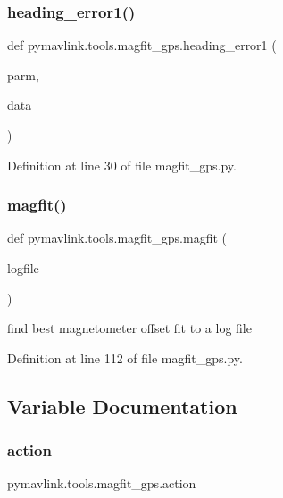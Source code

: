 \subsubsection{\texorpdfstring{heading\_error1()}{heading\_error1()}}
{\footnotesize\ttfamily def pymavlink.\+tools.\+magfit\+\_\+gps.\+heading\+\_\+error1 (\begin{DoxyParamCaption}\item[{}]{parm,  }\item[{}]{data }\end{DoxyParamCaption})}



Definition at line 30 of file magfit\+\_\+gps.\+py.

\mbox{\label{namespacepymavlink_1_1tools_1_1magfit__gps_a0d9ad9596239f056f8067ad0aa07409a}} 
\subsubsection{\texorpdfstring{magfit()}{magfit()}}
{\footnotesize\ttfamily def pymavlink.\+tools.\+magfit\+\_\+gps.\+magfit (\begin{DoxyParamCaption}\item[{}]{logfile }\end{DoxyParamCaption})}

\begin{DoxyVerb}find best magnetometer offset fit to a log file\end{DoxyVerb}
 

Definition at line 112 of file magfit\+\_\+gps.\+py.



\subsection{Variable Documentation}
\mbox{\label{namespacepymavlink_1_1tools_1_1magfit__gps_a005f587c63c9518cc0aca1f07fcc196b}} 
\subsubsection{\texorpdfstring{action}{action}}
{\footnotesize\ttfamily pymavlink.\+tools.\+magfit\+\_\+gps.\+action}



